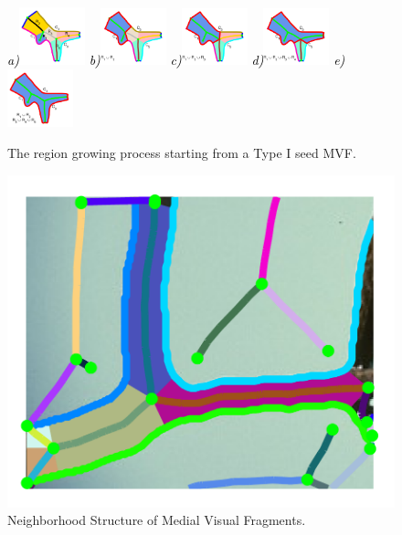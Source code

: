 \begin{figure}[!ht]
{\footnotesize\textit{\textcolor{black}{a)}}}\includegraphics[width=0.17\textwidth]{figs/fish_s6.pdf}
{\footnotesize\textit{\textcolor{black}{b)}}}\includegraphics[width=0.17\textwidth]{figs/fish_s7.pdf}
{\footnotesize\textit{\textcolor{black}{c)}}}\includegraphics[width=0.17\textwidth]{figs/fish_s8.pdf}
{\footnotesize\textit{\textcolor{black}{d)}}}\includegraphics[width=0.17\textwidth]{figs/fish_s9.pdf}
{\footnotesize\textit{\textcolor{black}{e)}}}\includegraphics[width=0.17\textwidth]{figs/fish_s10.pdf}
\caption{The region growing process starting from a Type I seed MVF.  } 
\label{fig:lc_steps_region}
\end{figure}

\begin{figure}[!ht]
\begin{center}
\includegraphics[width=0.2\linewidth]{figs/42049_00_rc_before_frags.pdf}
\end{center}
\caption{Neighborhood Structure of Medial Visual Fragments.}
\label{fig:tree_example}
\end{figure}


